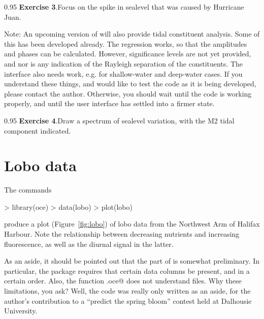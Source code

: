 \documentclass{article}
\newcommand{\workedexercise}[2]{
	\vspace{1ex}
	\begin{boxedminipage}[c]{0.95\linewidth}
		{\textbf{Exercise #1}.\hspace{1em}#2}
	\end{boxedminipage}
	\vspace{1ex}
}
\begin{document}
\workedexercise{3}{Focus on the spike in sealevel that was caused by Hurricane Juan.}

Note: An upcoming version of \verb@oce@ will also provide tidal constituent analysis. Some of
this has been developed already. The regression works, so that the amplitudes and phases can be
calculated. However, significance levels are not yet provided, and nor is any indication of the
Rayleigh separation of the constituents. The interface also needs work, e.g. for shallow-water
and deep-water cases. If you understand these things, and would like to test the code as it is
being developed, please contact the author. Otherwise, you should wait until the code is
working properly, and until the user interface has settled into a firmer state.

\workedexercise{4}{Draw a spectrum of sealevel variation, with the M2 tidal component indicated.}


\goodbreak

\section{Lobo data}
The commands
\begin{Schunk}
\begin{Sinput}
> library(oce)
> data(lobo)
> plot(lobo)
\end{Sinput}
\end{Schunk}
produce a plot (Figure~\ref{fig:lobo}) of lobo data from the Northwest Arm of Halifax Harbour.
Note the relationship between decreasing nutrients and increasing fluorescence, as well as the
diurnal signal in the latter.  

As an aside, it should be pointed out that the \verb@lobo@ part of \verb@oce@ is somewhat
preliminary. In particular, the package requires that certain data columns be present, and in a
certain order. Also, the function \verb@read.oce@ does not understand \verb@lobo@ files. Why
these limitations, you ask? Well, the \verb@lobo@ code was really only written as an aside, for
the author's contribution to a ``predict the spring bloom'' contest held at Dalhousie
University.
\end{document}

